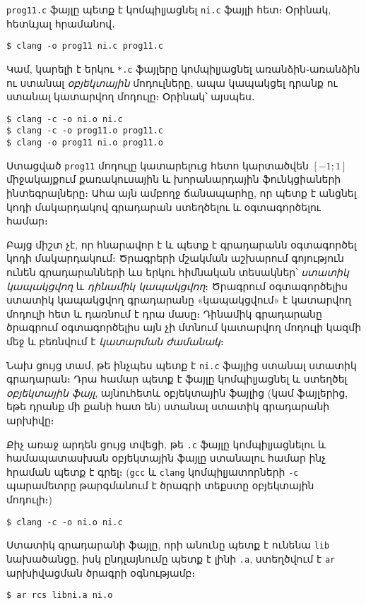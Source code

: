 \texttt{prog11.c} ֆայլը պետք է կոմպիլյացնել \texttt{ni.c}
ֆայլի հետ։ Օրինակ, հետևյալ հրամանով․

\begin{Verbatim}
$ clang -o prog11 ni.c prog11.c
\end{Verbatim}

Կամ, կարելի է երկու \Verb|*.c| ֆայլերը կոմպիլյացնել առանձին֊առանձին
ու ստանալ \emph{օբյեկտային} մոդուլները, ապա կապակցել դրանք ու ստանալ
կատարվող մոդուլը։ Օրինակ՝ այսպես․

\begin{Verbatim}
$ clang -c -o ni.o ni.c
$ clang -c -o prog11.o prog11.c
$ clang -o prog11 ni.o prog11.o
\end{Verbatim}

Ստացված \texttt{prog11} մոդուլը կատարելուց հետո կարտածվեն
\([-1;1]\) միջակայքում քառակուսային և խորանարդային ֆունկցիաների
ինտեգրալները։ Ահա այն ամբողջ ճանապարհը, որ պետք է անցնել կոդի
մակարդակով գրադարան ստեղծելու և օգտագործելու համար։

\tristar

Բայց միշտ չէ, որ հնարավոր է և պետք է գրադարանն օգտագործել կոդի
մակարդակում։ Ծրագրերի մշակման աշխարում գոյություն ունեն
գրադարանների ևս երկու հիմնական տեսակներ՝ \emph{ստատիկ կապակցվող}
և \emph{դինամիկ կապակցվող}։ Ծրագրում օգտագործելիս ստատիկ կապակցվող
գրադարանը «կապակցվում» է կատարվող մոդուլի հետ և դառնում է դրա
մասը։ Դինամիկ գրադարանը ծրագրում օգտագործելիս այն չի մտնում
կատարվող մոդուլի կազմի մեջ և բեռնվում է \emph{կատարման ժամանակ}։

Նախ ցույց տամ, թե ինչպես պետք է \texttt{ni.c} ֆայլից ստանալ
ստատիկ գրադարան։ Դրա համար պետք է ֆայլը կոմպիլյացնել և ստեղծել
\emph{օբյեկտային ֆայլ}, այնուհետև օբյեկտային ֆայլից (կամ ֆայլերից,
եթե դրանք մի քանի հատ են) ստանալ ստատիկ գրադարանի արխիվը։

Քիչ առաջ արդեն ցույց տվեցի, թե \Verb|.c| ֆայլը կոմպիլյացնելու
և համապատասխան օբյեկտային ֆայլը ստանալու համար ինչ հրաման պետք
է գրել։ (\texttt{gcc} և \texttt{clang} կոմպիլյատորների \Verb|-c|
պարամետրը թարգմանում է ծրագրի տեքստը օբյեկտային մոդուլի։)

\begin{Verbatim}
$ clang -c -o ni.o ni.c
\end{Verbatim}

Ստատիկ գրադարանի ֆայլը, որի անունը պետք է ունենա \texttt{lib}
նախածանցը, իսկ ընդլայնումը պետք է լինի \Verb|.a|, ստեղծվում է
\texttt{ar} արխիվացման ծրագրի օգնությամբ։

\begin{Verbatim}
$ ar rcs libni.a ni.o
\end{Verbatim}

